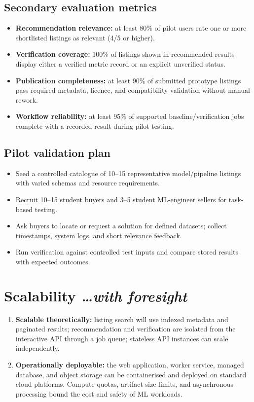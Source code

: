 \documentclass[11pt,a4paper]{article}
\newcommand{\BvrHint}[1]{{\normalfont\normalsize\itshape\hfill #1}}
\begin{document}
\subsection{Secondary evaluation metrics}
\begin{itemize}[leftmargin=0.7cm]
  \item \textbf{Recommendation relevance:} at least 80\% of pilot users rate one or more shortlisted listings as relevant (4/5 or higher).
  \item \textbf{Verification coverage:} 100\% of listings shown in recommended results display either a verified metric record or an explicit unverified status.
  \item \textbf{Publication completeness:} at least 90\% of submitted prototype listings pass required metadata, licence, and compatibility validation without manual rework.
  \item \textbf{Workflow reliability:} at least 95\% of supported baseline/verification jobs complete with a recorded result during pilot testing.
\end{itemize}

\subsection{Pilot validation plan}
\begin{itemize}[leftmargin=0.7cm]
  \item Seed a controlled catalogue of 10--15 representative model/pipeline listings with varied schemas and resource requirements.
  \item Recruit 10--15 student buyers and 3--5 student ML-engineer sellers for task-based testing.
  \item Ask buyers to locate or request a solution for defined datasets; collect timestamps, system logs, and short relevance feedback.
  \item Run verification against controlled test inputs and compare stored results with expected outcomes.
\end{itemize}

\section{Scalability \BvrHint{\ldots with foresight}}
\begin{enumerate}[leftmargin=0.7cm]
  \item \textbf{Scalable theoretically:} listing search will use indexed metadata and paginated results; recommendation and verification are isolated from the interactive API through a job queue; stateless API instances can scale independently.
  \item \textbf{Operationally deployable:} the web application, worker service, managed database, and object storage can be containerised and deployed on standard cloud platforms. Compute quotas, artifact size limits, and asynchronous processing bound the cost and safety of ML workloads.
\end{enumerate}
\end{document}
